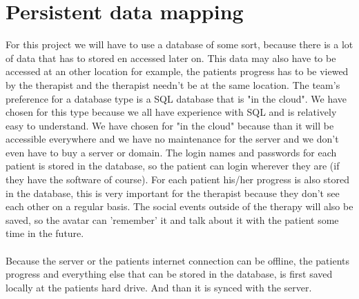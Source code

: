 \section{Persistent data mapping}
\label{sec:datamap}

For this project we will have to use a database of some sort, because there is a lot of data that has to stored en accessed later on. This data may also have to be accessed at an other location for example, the patients progress has to be viewed by the therapist and the therapist needn't be at the same location. The team's preference for a database type is a SQL database that is "in the cloud". We have chosen for this type because we all have experience with SQL and is relatively easy to understand. We have chosen for "in the cloud" because than it will be accessible everywhere and we have no maintenance for the server and we don't even have to buy a server or domain. 
The login names and passwords for each patient is stored in the database, so the patient can login wherever they are (if they have the software of course). For each patient his/her progress is also stored in the database, this is very important for the therapist because they don't see each other on a regular basis. The social events outside of the therapy will also be saved, so the avatar can 'remember' it and talk about it with the patient some time in the future.
\paragraph{}
Because the server or the patients internet connection can be offline, the patients progress and everything else that can be stored in the database, is first saved locally at the patients hard drive. And than it is synced with the server.